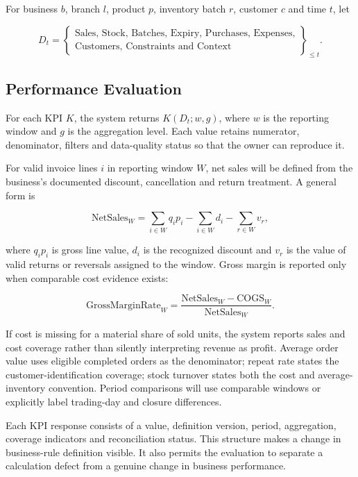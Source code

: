 For business $b$, branch $l$, product $p$, inventory batch $r$, customer $c$
and time $t$, let

\begin{equation}
  D_t=\left\{
  \begin{array}{c}
  \text{Sales, Stock, Batches, Expiry, Purchases, Expenses,}\\
  \text{Customers, Constraints and Context}
  \end{array}
  \right\}_{\leq t}.
\end{equation}

\subsection{Performance Evaluation}

For each KPI $K$, the system returns $K(D_t;w,g)$, where $w$ is the reporting
window and $g$ is the aggregation level. Each value retains numerator,
denominator, filters and data-quality status so that the owner can reproduce it.

For valid invoice lines $i$ in reporting window $W$, net sales will be defined
from the business's documented discount, cancellation and return treatment. A
general form is

\begin{equation}
\mathrm{NetSales}_{W}=\sum_{i\in W}q_i p_i
-\sum_{i\in W}d_i-\sum_{r\in W}v_r,
\label{eq:net_sales}
\end{equation}

where $q_i p_i$ is gross line value, $d_i$ is the recognized discount and
$v_r$ is the value of valid returns or reversals assigned to the window. Gross
margin is reported only when comparable cost evidence exists:

\begin{equation}
\mathrm{GrossMarginRate}_{W}=
\frac{\mathrm{NetSales}_{W}-\mathrm{COGS}_{W}}{\mathrm{NetSales}_{W}}.
\label{eq:gross_margin}
\end{equation}

If cost is missing for a material share of sold units, the system reports sales
and cost coverage rather than silently interpreting revenue as profit. Average
order value uses eligible completed orders as the denominator; repeat rate
states the customer-identification coverage; stock turnover states both the
cost and average-inventory convention. Period comparisons will use comparable
windows or explicitly label trading-day and closure differences.

Each KPI response consists of a value, definition version, period, aggregation,
coverage indicators and reconciliation status. This structure makes a change in
business-rule definition visible. It also permits the evaluation to separate a
calculation defect from a genuine change in business performance.

